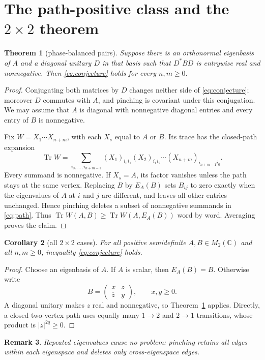 \documentclass[11pt]{article}
\newtheorem{theorem}{Theorem}[section]
\newtheorem{corollary}[theorem]{Corollary}
\newtheorem{remark}[theorem]{Remark}
\newcommand{\Tr}{\operatorname{Tr}}
\newcommand{\EA}{E_A}
\newcommand{\C}{\mathbb C}
\begin{document}
\section{The path-positive class and the \(2\times2\) theorem}
\begin{theorem}[phase-balanced pairs]\label{thm:phase}
Suppose there is an orthonormal eigenbasis of \(A\) and a diagonal unitary
\(D\) in that basis such that \(D^*BD\) is entrywise real and nonnegative.
Then \eqref{eq:conjecture} holds for every \(n,m\geq0\).
\end{theorem}
\begin{proof}
Conjugating both matrices by \(D\) changes neither side of
\eqref{eq:conjecture}; moreover \(D\) commutes with \(A\), and pinching is
covariant under this conjugation. We may assume that \(A\) is diagonal with
nonnegative diagonal entries and every entry of \(B\) is nonnegative.

Fix \(W=X_1\cdots X_{n+m}\), with each \(X_s\) equal to \(A\) or \(B\).
Its trace has the closed-path expansion
\begin{equation}\label{eq:path}
 \Tr W=\sum_{i_0,\ldots,i_{n+m-1}}
 (X_1)_{i_0i_1}(X_2)_{i_1i_2}\cdots
 (X_{n+m})_{i_{n+m-1}i_0}.
\end{equation}
Every summand is nonnegative. If \(X_s=A\), its factor vanishes unless the
path stays at the same vertex. Replacing \(B\) by \(\EA(B)\) sets
\(B_{ij}\) to zero exactly when the eigenvalues of \(A\) at \(i\) and \(j\)
are different, and leaves all other entries unchanged. Hence pinching
deletes a subset of nonnegative summands in \eqref{eq:path}. Thus
\(\Tr W(A,B)\geq\Tr W(A,\EA(B))\) word by word. Averaging proves the claim.
\end{proof}

\begin{corollary}[all \(2\times2\) cases]\label{cor:two}
For all positive semidefinite \(A,B\in M_2(\C)\) and all \(n,m\geq0\),
inequality \eqref{eq:conjecture} holds.
\end{corollary}
\begin{proof}
Choose an eigenbasis of \(A\). If \(A\) is scalar, then \(\EA(B)=B\).
Otherwise write
\[
 B=\begin{pmatrix}x&z\\ \overline z&y\end{pmatrix},
 \qquad x,y\geq0.
\]
A diagonal unitary makes \(z\) real and nonnegative, so
Theorem~\ref{thm:phase} applies. Directly, a closed two-vertex path uses
equally many \(1\to2\) and \(2\to1\) transitions, whose product is
\(|z|^{2q}\geq0\).
\end{proof}
\begin{remark}
Repeated eigenvalues cause no problem: pinching retains all edges within
each eigenspace and deletes only cross-eigenspace edges.
\end{remark}
\end{document}
